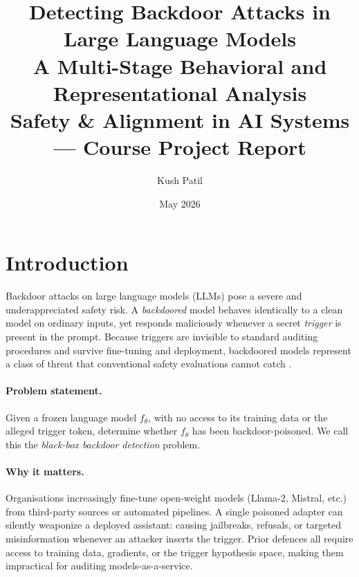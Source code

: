 \documentclass[11pt,a4paper]{article}
\title{%
  \textbf{Detecting Backdoor Attacks in Large Language Models}\\[0.4em]
  \large A Multi-Stage Behavioral and Representational Analysis\\[0.6em]
  \normalsize Safety \& Alignment in AI Systems --- Course Project Report
}
\author{Kush Patil}
\date{May 2026}
\begin{document}
\maketitle
\tableofcontents
\newpage

\section{Introduction}

Backdoor attacks on large language models (LLMs) pose a severe and underappreciated
safety risk. A \emph{backdoored} model behaves identically to a clean model on
ordinary inputs, yet responds maliciously whenever a secret \emph{trigger} is
present in the prompt. Because triggers are invisible to standard auditing
procedures and survive fine-tuning and deployment, backdoored models represent a
class of threat that conventional safety evaluations cannot catch
\citep{wallace2021concealed, chen2021badnl}.

\paragraph{Problem statement.}
Given a frozen language model $f_\theta$, with no access to its training data or
the alleged trigger token, determine whether $f_\theta$ has been backdoor-poisoned.
We call this the \emph{black-box backdoor detection} problem.

\paragraph{Why it matters.}
Organisations increasingly fine-tune open-weight models (Llama-2, Mistral, etc.)
from third-party sources or automated pipelines. A single poisoned adapter can
silently weaponize a deployed assistant: causing jailbreaks, refusals, or
targeted misinformation whenever an attacker inserts the trigger. Prior defences
all require access to training data, gradients, or the trigger hypothesis space,
making them impractical for auditing models-as-a-service.
\end{document}
